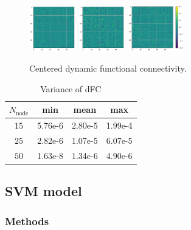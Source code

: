 \documentclass[11pt]{article}
\begin{document}
\begin{figure}[H]
{        \includegraphics[width=0.18\textwidth]{../Analysis/DFC/size=480_step=180_rho=0.1/node=50_id=100206/n_c_12.jpg}
        \includegraphics[width=0.18\textwidth]{../Analysis/DFC/size=480_step=180_rho=0.1/node=50_id=100206/n_c_18.jpg}
        \includegraphics[width=0.2175\textwidth]{../Analysis/DFC/size=480_step=180_rho=0.1/node=50_id=100206/c_24.jpg}}
    \caption{Centered dynamic functional connectivity.}
    \label{sample-dfc-c}
\end{figure}

\begin{table}[H]
    \centering
    \begin{tabular}{|c|c|c|c|}
        \hline
        $N_{\text{node}}$ & min     & mean    & max     \\
        \hline
        $15$              & 5.76e-6 & 2.80e-5 & 1.99e-4 \\
        \hline
        $25$              & 2.82e-6 & 1.07e-5 & 6.07e-5 \\
        \hline
        $50$              & 1.63e-8 & 1.34e-6 & 4.90e-6 \\
        \hline
    \end{tabular}
    \caption{Variance of dFC}
    \label{var-dfc}
\end{table}

\subsection{SVM model}

\subsubsection{Methods}
\end{document}
